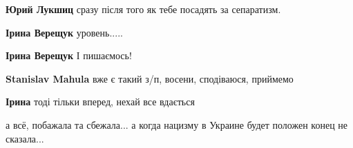 \begin{itemize}
\begin{itemize}
 
\textbf{Юрий Лукшиц} сразу після того як тебе посадять за сепаратизм.

 
\textbf{Ірина Верещук} уровень.....

 
\textbf{Ірина Верещук} І пишаємось!

 

\textbf{Stanislav Mahula} вже є такий з/п, восени, сподіваюся, приймемо

 
\textbf{Ірина} тоді тільки вперед, нехай все вдається

 
а всё, побажала та сбежала... а когда нацизму в Украине будет положен конец не сказала...

 

\end{itemize}
\end{itemize}
